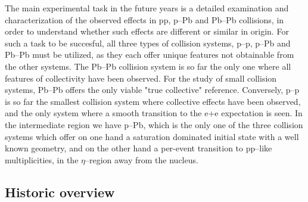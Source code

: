 \documentclass[../report.tex]{subfiles}
\begin{document}
The main experimental task in the future years is a detailed examination and characterization of the observed effects in pp, p--Pb and Pb--Pb collisions, in order to understand whether such effects are different or similar in origin. For such a task to be succesful, all three types of collision systems, p--p, p--Pb and Pb--Pb must be utilized, as they each offer unique features not obtainable from the other systems. The Pb--Pb collision system is so far the only one where all features of collectivity have been observed. For the study of small collision systems, Pb--Pb offers the only viable "true collective" reference. Conversely, p--p is so far the smallest collision system where collective effects have been observed, and the only system where a smooth transition to the e+e expectation is seen. In the intermediate region we have p--Pb, which is the only one of the three collision systems which offer on one hand a saturation dominated initial state with a well known geometry, and on the other hand a per-event transition to pp--like multiplicities, in the $\eta$--region away from the nucleus.


\subsection{Historic overview}
\label{sect:smallsystems_historicoverview}
\end{document}
